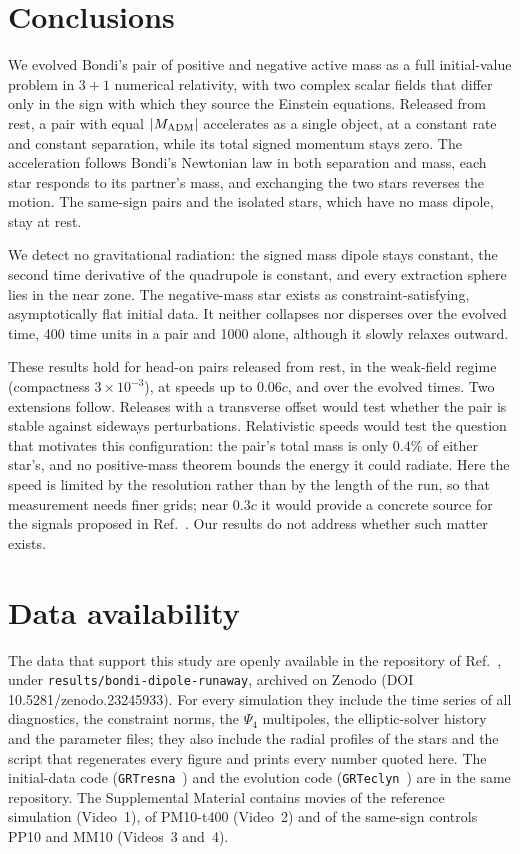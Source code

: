 \documentclass[twocolumn,floatfix,aps,prd,superscriptaddress,nofootinbib]{revtex4-2}
\begin{document}
\section{Conclusions}
\label{sec:discussion}

We evolved Bondi's pair of positive and negative active mass as a full initial-value problem in $3{+}1$ numerical relativity, with two complex scalar fields that differ only in the sign with which they source the Einstein equations. Released from rest, a pair with equal $|M_{\rm ADM}|$ accelerates as a single object, at a constant rate and constant separation, while its total signed momentum stays zero. The acceleration follows Bondi's Newtonian law in both separation and mass, each star responds to its partner's mass, and exchanging the two stars reverses the motion. The same-sign pairs and the isolated stars, which have no mass dipole, stay at rest.

We detect no gravitational radiation: the signed mass dipole stays constant, the second time derivative of the quadrupole is constant, and every extraction sphere lies in the near zone. The negative-mass star exists as constraint-satisfying, asymptotically flat initial data. It neither collapses nor disperses over the evolved time, 400 time units in a pair and 1000 alone, although it slowly relaxes outward.

These results hold for head-on pairs released from rest, in the weak-field regime (compactness $3\times10^{-3}$), at speeds up to $0.06c$, and over the evolved times. Two extensions follow. Releases with a transverse offset would test whether the pair is stable against sideways perturbations. Relativistic speeds would test the question that motivates this configuration: the pair's total mass is only $0.4\%$ of either star's, and no positive-mass theorem bounds the energy it could radiate. Here the speed is limited by the resolution rather than by the length of the run, so that measurement needs finer grids; near $0.3c$ it would provide a concrete source for the signals proposed in Ref.~\cite{trivedi_loeb2026}. Our results do not address whether such matter exists.

\section*{Data availability}
\label{sec:repro}

The data that support this study are openly available in the repository of Ref.~\cite{repo}, under \texttt{results/bondi-dipole-runaway}, archived on Zenodo (DOI 10.5281/zenodo.23245933). For every simulation they include the time series of all diagnostics, the constraint norms, the $\Psi_4$ multipoles, the elliptic-solver history and the parameter files; they also include the radial profiles of the stars and the script that regenerates every figure and prints every number quoted here. The initial-data code (\texttt{GRTresna}~\cite{grtresna}) and the evolution code (\texttt{GRTeclyn}~\cite{grteclyn,amrex,grchombo}) are in the same repository. The Supplemental Material contains movies of the reference simulation (Video~1), of PM10-t400 (Video~2) and of the same-sign controls PP10 and MM10 (Videos~3 and~4).
\end{document}
